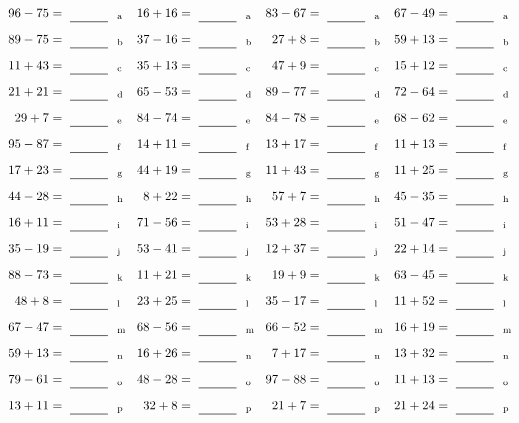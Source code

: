 \documentclass
[
  draft    = true,
  fontsize = 11pt,
  parskip  = half-
]
{scrartcl}
\begin{document}
\clearpage
\begin{align*}
    \pline{96-75}&=\rline{a}
  & \pline{16+16}&=\rline{a}
  & \pline{83-67}&=\rline{a}
  & \pline{67-49}&=\rline{a} \\[1ex]
    \pline{89-75}&=\rline{b}
  & \pline{37-16}&=\rline{b}
  & \pline{27+8}&=\rline{b}
  & \pline{59+13}&=\rline{b} \\[1ex]
    \pline{11+43}&=\rline{c}
  & \pline{35+13}&=\rline{c}
  & \pline{47+9}&=\rline{c}
  & \pline{15+12}&=\rline{c} \\[1ex]
    \pline{21+21}&=\rline{d}
  & \pline{65-53}&=\rline{d}
  & \pline{89-77}&=\rline{d}
  & \pline{72-64}&=\rline{d} \\[1ex]
    \pline{29+7}&=\rline{e}
  & \pline{84-74}&=\rline{e}
  & \pline{84-78}&=\rline{e}
  & \pline{68-62}&=\rline{e} \\[1ex]
    \pline{95-87}&=\rline{f}
  & \pline{14+11}&=\rline{f}
  & \pline{13+17}&=\rline{f}
  & \pline{11+13}&=\rline{f} \\[1ex]
    \pline{17+23}&=\rline{g}
  & \pline{44+19}&=\rline{g}
  & \pline{11+43}&=\rline{g}
  & \pline{11+25}&=\rline{g} \\[1ex]
    \pline{44-28}&=\rline{h}
  & \pline{8+22}&=\rline{h}
  & \pline{57+7}&=\rline{h}
  & \pline{45-35}&=\rline{h} \\[1ex]
    \pline{16+11}&=\rline{i}
  & \pline{71-56}&=\rline{i}
  & \pline{53+28}&=\rline{i}
  & \pline{51-47}&=\rline{i} \\[1ex]
    \pline{35-19}&=\rline{j}
  & \pline{53-41}&=\rline{j}
  & \pline{12+37}&=\rline{j}
  & \pline{22+14}&=\rline{j} \\[1ex]
    \pline{88-73}&=\rline{k}
  & \pline{11+21}&=\rline{k}
  & \pline{19+9}&=\rline{k}
  & \pline{63-45}&=\rline{k} \\[1ex]
    \pline{48+8}&=\rline{l}
  & \pline{23+25}&=\rline{l}
  & \pline{35-17}&=\rline{l}
  & \pline{11+52}&=\rline{l} \\[1ex]
    \pline{67-47}&=\rline{m}
  & \pline{68-56}&=\rline{m}
  & \pline{66-52}&=\rline{m}
  & \pline{16+19}&=\rline{m} \\[1ex]
    \pline{59+13}&=\rline{n}
  & \pline{16+26}&=\rline{n}
  & \pline{7+17}&=\rline{n}
  & \pline{13+32}&=\rline{n} \\[1ex]
    \pline{79-61}&=\rline{o}
  & \pline{48-28}&=\rline{o}
  & \pline{97-88}&=\rline{o}
  & \pline{11+13}&=\rline{o} \\[1ex]
    \pline{13+11}&=\rline{p}
  & \pline{32+8}&=\rline{p}
  & \pline{21+7}&=\rline{p}
  & \pline{21+24}&=\rline{p}
\end{align*}
\end{document}
